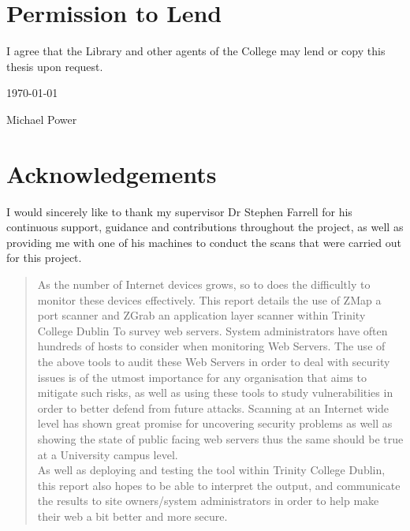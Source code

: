\documentclass[a4wide,leqno,12pt]{report}
\begin{document}
\chapter*{Permission to Lend}

I agree that the Library and other agents of
the College may lend or copy this thesis upon request.

\begin{center}
\vspace*{2in}

\underline{\hspace*{3in}} \today

Michael Power


\end{center}


\chapter*{Acknowledgements}
I would sincerely like to thank my supervisor Dr Stephen Farrell for his continuous support, guidance and contributions  throughout the project, as well as providing me with one of his machines to conduct the scans that were carried out for this project. 

\newpage



\tableofcontents
\listoffigures
\listoftables


\begin{abstract}
\noindent
As the number of Internet devices grows, so to does the difficultly to monitor these devices effectively. This report details the use of ZMap a port scanner and ZGrab an application layer scanner within Trinity College Dublin To survey web servers. System administrators have often hundreds of hosts to consider when monitoring Web Servers. The use of the above tools to audit these Web Servers in order to deal with security issues is of the utmost importance for any organisation that aims to mitigate such risks, as well as using these tools to study vulnerabilities in order to better defend from future attacks. Scanning at an Internet wide level has shown great promise for uncovering security problems as well as showing the state of public facing web servers \cite{durumeric2015search} thus the same should be true at a University campus level.\\

As well as deploying and testing the tool within Trinity College Dublin, this report also hopes to be able to interpret the output, and communicate the results to site owners/system administrators in order to help make their web a bit better and more secure.

\end{abstract}
\end{document}

